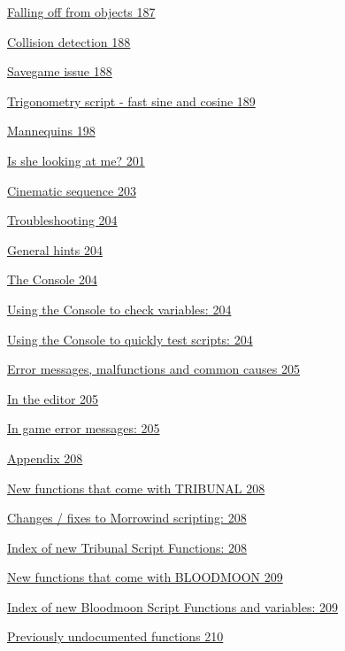 \documentclass[
]{article}
\begin{document}
\protect\hyperlink{falling-off-from-objects}{Falling off from objects
187}

\protect\hyperlink{collision-detection}{Collision detection 188}

\protect\hyperlink{savegame-issue}{Savegame issue 188}

\protect\hyperlink{trigonometry-script---fast-sine-and-cosine}{Trigonometry
script - fast sine and cosine 189}

\protect\hyperlink{mannequins}{Mannequins 198}

\protect\hyperlink{is-she-looking-at-me}{Is she looking at me? 201}

\protect\hyperlink{cinematic-sequence}{Cinematic sequence 203}

\protect\hyperlink{troubleshooting}{Troubleshooting 204}

\protect\hyperlink{general-hints}{General hints 204}

\protect\hyperlink{the-console}{The Console 204}

\protect\hyperlink{using-the-console-to-check-variables}{Using the
Console to check variables: 204}

\protect\hyperlink{using-the-console-to-quickly-test-scripts}{Using the
Console to quickly test scripts: 204}

\protect\hyperlink{error-messages-malfunctions-and-common-causes}{Error
messages, malfunctions and common causes 205}

\protect\hyperlink{in-the-editor}{In the editor 205}

\protect\hyperlink{in-game-error-messages}{In game error messages: 205}

\protect\hyperlink{appendix}{Appendix 208}

\protect\hyperlink{new-functions-that-come-with-tribunal}{New functions
that come with TRIBUNAL 208}

\protect\hyperlink{changes-fixes-to-morrowind-scripting}{Changes / fixes
to Morrowind scripting: 208}

\protect\hyperlink{index-of-new-tribunal-script-functions}{Index of new
Tribunal Script Functions: 208}

\protect\hyperlink{new-functions-that-come-with-bloodmoon}{New functions
that come with BLOODMOON 209}

\protect\hyperlink{index-of-new-bloodmoon-script-functions-and-variables}{Index
of new Bloodmoon Script Functions and variables: 209}

\protect\hyperlink{previously-undocumented-functions}{Previously
undocumented functions 210}
\end{document}
